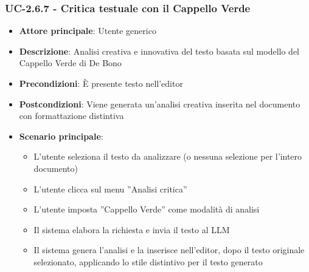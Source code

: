 \documentclass[11pt,a4paper]{article}
\begin{document}
\subsubsection{UC-2.6.7 - Critica testuale con il Cappello Verde}
\begin{itemize}
    \item \textbf{Attore principale}: Utente generico
    \item \textbf{Descrizione}: Analisi creativa e innovativa del testo basata sul modello del Cappello Verde di De Bono
    \item \textbf{Precondizioni}: È presente testo nell’editor
    \item \textbf{Postcondizioni}: Viene generata un’analisi creativa inserita nel documento con formattazione distintiva
    \item \textbf{Scenario principale}:
    \begin{itemize}
        \item L’utente seleziona il testo da analizzare (o nessuna selezione per l'intero documento)
        \item L’utente clicca sul menu ”Analisi critica”
        \item L’utente imposta ”Cappello Verde” come modalità di analisi
        \item Il sistema elabora la richiesta e invia il testo al LLM
        \item Il sistema genera l'analisi e la inserisce nell'editor, dopo il testo originale selezionato, applicando lo stile distintivo per il testo generato
    \end{itemize}
\end{itemize}
\end{document}
